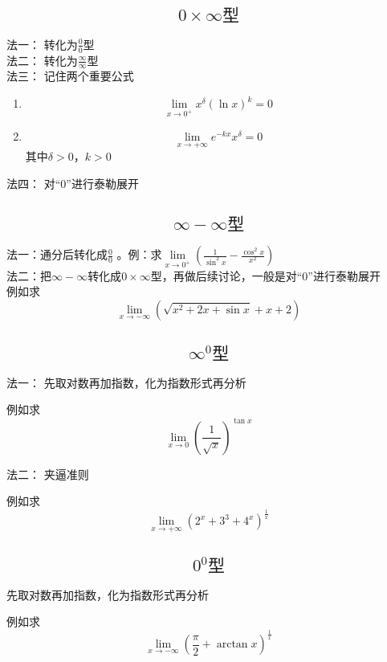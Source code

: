 \documentclass[a4paper,11pt]{book}
\begin{document}
\subsection*{\[0 \times \infty \text{型}\]}

法一： 转化为$\frac{0}{0}$型\\
法二： 转化为$\frac{\infty}{\infty}$型\\
法三： 记住两个重要公式
\begin{enumerate}
    \item \[\lim _{x \rightarrow 0^{+}} x^{\delta}(\ln x)^{k}=0\]
    \item \[\lim _{x \rightarrow + \infty} e^{-k x} x^{\delta}=0\] \qquad 其中$\delta > 0，k > 0$
\end{enumerate}
法四： 对“0”进行泰勒展开

\subsection*{\[\infty - \infty \text{型}\]}

法一：通分后转化成$\frac{0}{0}$ 。例：求$\lim\limits _{x \rightarrow 0^{+}} \left(\frac{1}{\sin ^{2} x}-\frac{\cos ^{2}x}{x^{2}}\right)$ \\


\noindent 法二：把$\infty - \infty$转化成$0 \times \infty$型，再做后续讨论，一般是对“0”进行泰勒展开\\

例如求\[\lim _{x \rightarrow - \infty }(\sqrt{x^{2}+2 x+\sin x}+x+2)\]

\subsection*{\[\infty^0 \text{型}\]}
法一： 先取对数再加指数，化为指数形式再分析

例如求 \[\lim _{x \rightarrow 0}\left(\frac{1}{\sqrt{x}}\right)^{\tan x} \]

\noindent 法二： 夹逼准则

例如求\[\lim_{x \rightarrow + \infty}\left(2^x+3^3+4^x\right)^{\frac{1}{x}}\]

\subsection*{\[0^0 \text{型}\]}

先取对数再加指数，化为指数形式再分析

例如求\[\lim \limits_{x\rightarrow - \infty} \left(\frac{\pi}{2}+\arctan x\right)^{\frac{1}{x}}\]
\end{document}
